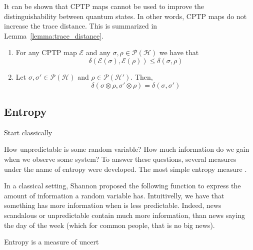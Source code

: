 It can be shown that CPTP maps cannot be used to improve the distinguishability between quantum states. In other words, CPTP maps do not increase the trace distance. This is summarized in Lemma~\ref{lemma:trace_distance}.




\begin{lemma}

\begin{enumerate}

    The trace distance has the following properties:

    \item For any CPTP map $\mathcal{E}$ and any $\sigma, \rho \in \mathcal{P}(\mathcal{H})$ we have that
    $$\delta(\mathcal{E}(\sigma), \mathcal{E}(\rho)) \leq \delta(\sigma, \rho)$$
    
    \item Let $\sigma, \sigma' \in \mathcal{P}(\mathcal{H})$ and $\rho \in \mathcal{P}(\mathcal{H}')$. Then,
    $$\delta(\sigma\otimes \rho, \sigma'\otimes \rho) = \delta(\sigma, \sigma')$$
\end{enumerate}

\label{lemma:trace_distance}
\end{lemma}


\subsection{Entropy}

{\cv Start classically}

How unpredictable is some random variable? How much information do we gain when we observe some system? To answer these questions, several measures under the name of entropy were developed. The most simple entropy measure .

In a classical setting, Shannon proposed the following function to express the amount of information a random variable has. Intuitivelly, we have that something has more information when is less predictable. Indeed, news scandalous or unpredictable contain much more information, than news saying the day of the week (which for common people, that is no big news).

Entropy is a measure of uncert

